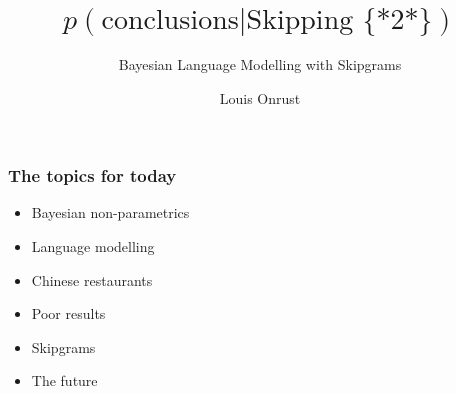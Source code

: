 \documentclass{beamer}
\author{Louis Onrust}
\title{$p(\text{conclusions} | \text{Skipping \{*2*\}})$}
\subtitle{Bayesian Language Modelling with Skipgrams}
\date{}
\begin{document}
\begin{frame}
	\titlepage
\end{frame}

\begin{frame}
    \frametitle{The topics for today}
    \begin{itemize}
        \item Bayesian non-parametrics
        \item Language modelling
        \item Chinese restaurants
        \item Poor results
        \item Skipgrams
        \item The future
    \end{itemize}
\end{frame}
\end{document}
